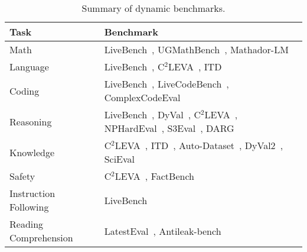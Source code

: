 \begin{table*}[ht]
    \centering
    \small
    \begin{tabularx}{\textwidth}{lX}
        \toprule
        \textbf{Task} & \textbf{Benchmark} \\ 
        \midrule
        Math & LiveBench~\citep{white2024livebench}, UGMathBench~\citep{xu2025ugmathbench}, Mathador-LM~\citep{kurtic-etal-2024-mathador} \\
        Language & LiveBench~\citep{white2024livebench}, C$^2$LEVA~\citep{li2024c}, ITD~\citep{zhu-etal-2024-inference} \\
        Coding   & LiveBench~\citep{white2024livebench}, LiveCodeBench~\citep{jain2024livecodebenchholisticcontaminationfree}, ComplexCodeEval~\citep{10.1145/3691620.3695552} \\
        Reasoning & LiveBench~\citep{white2024livebench}, DyVal~\citep{zhu2024dyval}, C$^2$LEVA~\citep{li2024c}, NPHardEval~\citep{fan-etal-2024-nphardeval}, S3Eval~\citep{lei-etal-2024-s3eval}, DARG~\citep{zhang2024darg} \\
        Knowledge & C$^2$LEVA~\citep{li2024c}, ITD~\citep{zhu-etal-2024-inference}, Auto-Dataset~\citep{ying2024automating}, DyVal2~\citep{10.5555/3692070.3694661}, SciEval~\citep{sun2024scieval} \\
        Safety & C$^2$LEVA~\citep{li2024c}, FactBench~\citep{bayat2024factbench} \\
        Instruction Following & LiveBench~\citep{white2024livebench} \\
        Reading Comprehension & LatestEval~\citep{li2023avoiding}, Antileak-bench~\citep{wu2024antileak} \\
        \bottomrule 
        \end{tabularx}
    
    \caption{Summary of dynamic benchmarks.}
    \label{tab:dynamic-benchmarks}
\end{table*}